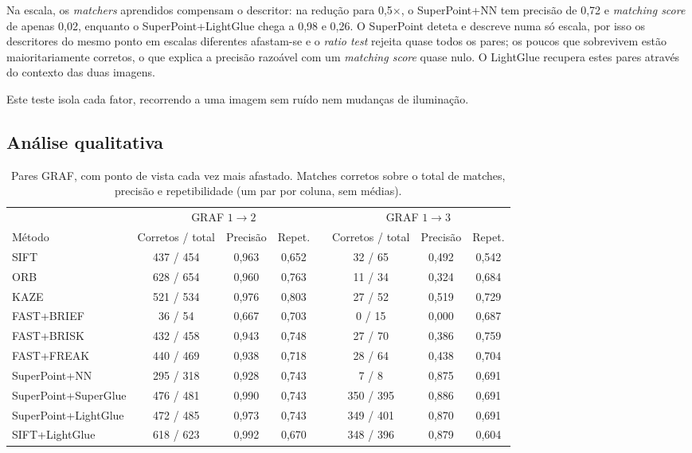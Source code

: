 \documentclass[11pt,a4paper]{article}
\begin{document}
Na escala, os \textit{matchers} aprendidos compensam o descritor: na redução para 0,5$\times$, o SuperPoint+NN tem precisão de 0,72 e \textit{matching score} de apenas 0,02, enquanto o SuperPoint+LightGlue chega a 0,98 e 0,26. O SuperPoint deteta e descreve numa só escala, por isso os descritores do mesmo ponto em escalas diferentes afastam-se e o \textit{ratio test} rejeita quase todos os pares; os poucos que sobrevivem estão maioritariamente corretos, o que explica a precisão razoável com um \textit{matching score} quase nulo. O LightGlue recupera estes pares através do contexto das duas imagens.

Este teste isola cada fator, recorrendo a uma imagem sem ruído nem mudanças de iluminação.

\subsection{Análise qualitativa}
\label{sec:qualitativa}

\begin{table}[H]
\centering\small
\caption{Pares GRAF, com ponto de vista cada vez mais afastado. Matches corretos sobre o total de matches,
precisão e repetibilidade (um par por coluna, sem médias).}
\label{tab:graf}
\begin{tabular}{lccccccc}
\toprule
 & \multicolumn{3}{c}{GRAF $1\to2$} & & \multicolumn{3}{c}{GRAF $1\to3$} \\
\cmidrule(lr){2-4}\cmidrule(lr){6-8}
Método & Corretos / total & Precisão & Repet. & & Corretos / total & Precisão & Repet. \\
\midrule
SIFT & 437 / 454 & 0,963 & 0,652 & & 32 / 65 & 0,492 & 0,542 \\
ORB & 628 / 654 & 0,960 & 0,763 & & 11 / 34 & 0,324 & 0,684 \\
KAZE & 521 / 534 & 0,976 & 0,803 & & 27 / 52 & 0,519 & 0,729 \\
FAST+BRIEF & 36 / 54 & 0,667 & 0,703 & & 0 / 15 & 0,000 & 0,687 \\
FAST+BRISK & 432 / 458 & 0,943 & 0,748 & & 27 / 70 & 0,386 & 0,759 \\
FAST+FREAK & 440 / 469 & 0,938 & 0,718 & & 28 / 64 & 0,438 & 0,704 \\
\midrule
SuperPoint+NN & 295 / 318 & 0,928 & 0,743 & & 7 / 8 & 0,875 & 0,691 \\
SuperPoint+SuperGlue & 476 / 481 & 0,990 & 0,743 & & 350 / 395 & 0,886 & 0,691 \\
SuperPoint+LightGlue & 472 / 485 & 0,973 & 0,743 & & 349 / 401 & 0,870 & 0,691 \\
SIFT+LightGlue & 618 / 623 & 0,992 & 0,670 & & 348 / 396 & 0,879 & 0,604 \\
\bottomrule
\end{tabular}
\end{table}
\end{document}
